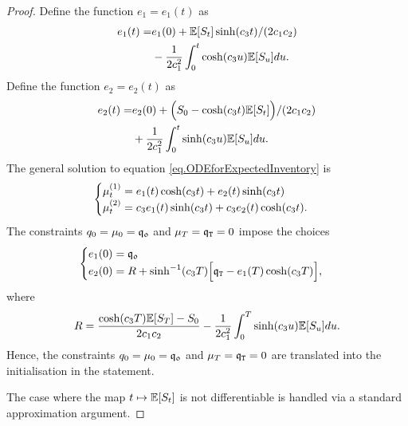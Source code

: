 \documentclass[10pt,a4paper]{article}
\begin{document}
\begin{proof}
Define the function $e_1=e_1(t)$ as 
\begin{equation*}
\begin{split}
e_1(t) = & e_1(0) + \mathbb{{E}}[S_t]\sinh(c_{3} t)/ (2c_{1} c_{2}) \\
& - \frac{1}{2c_{1}^{2} } \int_{0}^{t} \cosh(c_{3} u) \mathbb{{E}}[S_u] du.
\end{split}
\end{equation*}
Define the function $e_2=e_2(t)$ as 
\begin{equation*}
\begin{split}
e_2(t) = & e_2(0) +  \Big(S_0 -\cosh(c_{3} t)\mathbb{{E}}[S_t]\Big)/ (2c_{1} c_{2}) \\
& + \frac{1}{2c_{1}^{2} } \int_{0}^{t} \sinh(c_{3} u) \mathbb{{E}}[S_u] du.
\end{split}
\end{equation*}
The general solution to equation \eqref{eq.ODEforExpectedInventory} is
\begin{equation*}
\begin{cases}
\mu^{(1)}_t = e_1(t) \cosh(c_{3} t ) + e_2(t)\sinh(c_{3} t) \\
\mu^{(2)}_t = c_{3} e_1(t) \sinh(c_{3} t ) + c_{3} e_2(t)\cosh(c_{3} t).
\end{cases}
\end{equation*}
 The constraints $q_0 = \mu_0 = \mathfrak{q_0}$ and $\mu_T  = \mathfrak{q}_{\mathtt{T} } = 0$ impose the choices
 \begin{equation*}
 \begin{cases}
 e_1(0)=\mathfrak{q_0} \\
 e_2(0)=R+\sinh^{-1} (c_{3} T)\Big[\mathfrak{q}_{\mathtt{T} } - e_1(T)\cosh(c_{3} T)\Big],
 \end{cases}
 \end{equation*}
 where 
 \begin{equation*}
 R= \frac{\cosh(c_{3} T)\mathbb{{E}}[S_T] - S_0}{2c_{1}c_{2}}
 -\frac{1}{2c_{1}^{2}}\int_{0}^{T} \sinh(c_{3} u)\mathbb{{E}}[S_u]du.
 \end{equation*}
 Hence, the constraints $q_0 = \mu_0 = \mathfrak{q_0}$ and $\mu_T  = \mathfrak{q}_{\mathtt{T} } = 0$ are translated into the initialisation in the statement. 
 
 The case where the map $t\mapsto \mathbb{{E}}[S_t]$ is not differentiable is handled via a standard approximation argument.
\end{proof}
\end{document}

